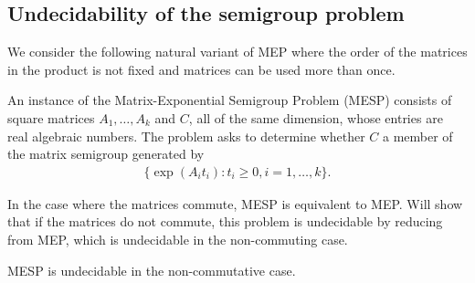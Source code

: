 \subsection{Undecidability of the semigroup problem}

We consider the following natural variant of MEP where the order of the matrices
in the product is not fixed and matrices can be used more than once.

\begin{definition}
  An instance of the Matrix-Exponential Semigroup Problem (MESP) consists of
  square matrices $A_{1}, \ldots, A_{k}$ and $C$, all of the same
  dimension, whose entries are real algebraic numbers.  The problem
 asks to determine whether $C$ a member of the matrix semigroup generated by
\begin{align*}
\lbrace \exp(A_{i} t_{i}) : t_{i} \geq 0 , i=1,\ldots,k \rbrace.
\end{align*}
\end{definition}

In the case where the matrices commute, MESP is equivalent to MEP. Will show that
if the matrices do not commute, this problem is undecidable by reducing from MEP,
which is undecidable in the non-commuting case.

\begin{theorem}
  MESP is undecidable in the non-commutative case.
\end{theorem}

